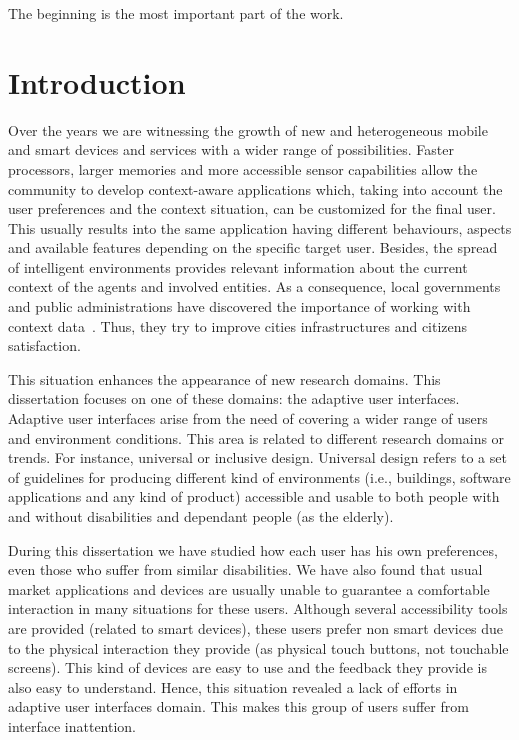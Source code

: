 \begin{savequote}[50mm]
The beginning is the most important part of the work. 
\end{savequote}

\chapter{Introduction}
\label{cha:introduction}

\ifpdf
    \graphicspath{{1_introduction/figures/PNG/}{1_introduction/figures/PDF/}{1_introduction/figures/}}
\else
    \graphicspath{{1_introduction/figures/EPS/}{1_introduction/figures/}}
\fi


Over the years we are witnessing the growth of new and heterogeneous mobile and
smart devices and services with a wider range of possibilities. Faster processors,
larger memories and more accessible sensor capabilities allow the community to
develop context-aware applications which, taking into account the user preferences
and the context situation, can be customized for the final user. This usually
results into the same application having different behaviours, aspects and 
available features depending on the specific target user. Besides, the spread 
of intelligent environments provides relevant information about the current 
context of the agents and involved entities. As a consequence, local 
governments and public administrations have discovered the importance of 
working with context data~\citep{caragliu_smart_2009}. Thus, they try to 
improve cities infrastructures and citizens satisfaction.

This situation enhances the appearance of new research domains. This 
dissertation focuses on one of these domains: the adaptive user interfaces. 
Adaptive user interfaces arise from the need of covering a wider range of users 
and environment conditions. This area is related to different research domains 
or trends. For instance, universal or inclusive design. Universal design refers 
to a set of guidelines for producing different kind of environments (i.e., 
buildings, software applications and any kind of product) accessible and usable 
to both people with and without disabilities and dependant people (as the 
elderly).

During this dissertation we have studied how each user has his own preferences,
even those who suffer from similar disabilities. We have also found that usual 
market applications and devices are usually unable to guarantee a comfortable 
interaction in many situations for these users. Although several accessibility 
tools are provided (related to smart devices), these users prefer non smart 
devices due to the physical interaction they provide (as physical touch 
buttons, not touchable screens). This kind of devices are easy to use and the 
feedback they provide is also easy to understand. Hence, this situation 
revealed a lack of efforts in adaptive user interfaces domain. This makes this 
group of users suffer from interface inattention.

